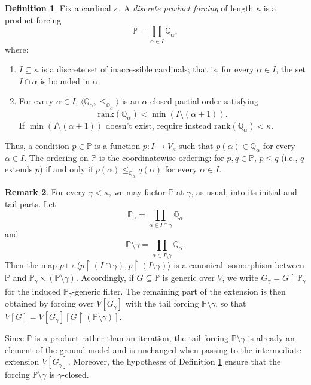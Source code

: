 \documentclass{article}
\theoremstyle{definition}
\newtheorem{definition}{Definition}[section]
\newtheorem{remark}[definition]{Remark}
\theoremstyle{plain}
\newcommand{\po}{\mathbb{P}}
\newcommand{\qo}{\mathbb{Q}}
\begin{document}
\begin{definition}\label{Def:discrete-product-forcings}
Fix a cardinal $\kappa$. A \emph{discrete product forcing} of length $\kappa$ is a product forcing
$$\po=\prod_{\alpha\in I}\qo_\alpha,$$
where:
\begin{enumerate}
    \item $I\subseteq\kappa$ is a discrete set of inaccessible cardinals; that is, for every $\alpha\in I$, the set $I\cap\alpha$ is bounded in $\alpha$.
    
    \item For every $\alpha\in I$, $\langle\qo_\alpha,\leq_{\qo_\alpha}\rangle$ is an $\alpha$-closed partial order satisfying
    \[
    \text{rank}(\qo_\alpha)<\min(I\setminus(\alpha+1)).
    \]
    If $\min(I\setminus (\alpha+1))$ doesn't exist, require instead $\text{rank}(\qo_\alpha)<\kappa$.
\end{enumerate}
Thus, a condition $p\in\po$ is a function $
p:I\to V_\kappa$
 such that $p(\alpha)\in\qo_\alpha$ for every $\alpha\in I$. The ordering on $\po$ is the coordinatewise ordering: for $p,q\in\po$, $
p\leq q$ (i.e., $q$ extends $p$) if and only if $p(\alpha)\leq_{\qo_\alpha} q(\alpha)
$ for every $\alpha\in I$.
\end{definition}


\begin{remark}
For every $\gamma<\kappa$, we may factor $\po$ at $\gamma$, as usual, into its initial and tail parts. Let
$$\po_\gamma=\prod_{\alpha\in I\cap\gamma}\qo_\alpha$$
and
$$\po\setminus\gamma=\prod_{\alpha\in I\setminus\gamma}\qo_\alpha.$$
Then the map
$p\longmapsto \langle p\restriction(I\cap\gamma),p\restriction(I\setminus\gamma)\rangle$
is a canonical isomorphism between $\po$ and $\po_\gamma\times(\po\setminus\gamma)$. Accordingly, if $G\subseteq\po$ is generic over $V$, we write $G_\gamma=G\restriction\po_\gamma$ for the induced $\po_\gamma$-generic filter. The remaining part of the extension is then obtained by forcing over $V[G_\gamma]$ with the tail forcing $\po\setminus\gamma$, so that
$V[G]=V[G_\gamma][G\restriction(\po\setminus\gamma)].$

Since $\po$ is a product rather than an iteration, the tail forcing $\po\setminus \gamma$ is already an element of the ground model and is unchanged when passing to the intermediate extension $V[G_\gamma]$. Moreover, the hypotheses of Definition \ref{Def:discrete-product-forcings} ensure that the forcing $\po\setminus \gamma$ is $\gamma$-closed.
\end{remark}
\end{document}
